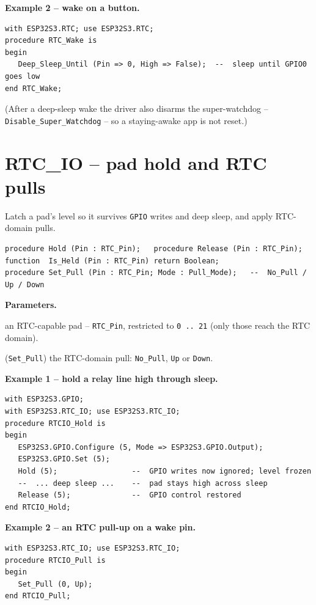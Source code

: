 \textbf{Example 2 -- wake on a button.}
\begin{lstlisting}
with ESP32S3.RTC; use ESP32S3.RTC;
procedure RTC_Wake is
begin
   Deep_Sleep_Until (Pin => 0, High => False);  --  sleep until GPIO0 goes low
end RTC_Wake;
\end{lstlisting}
(After a deep-sleep wake the driver also disarms the super-watchdog --
\texttt{Disable\_Super\_Watchdog} -- so a staying-awake app is not reset.)

\section{RTC\_IO -- pad hold and RTC pulls}

Latch a pad's level so it survives \texttt{GPIO} writes and deep sleep, and apply
RTC-domain pulls.

\begin{lstlisting}
procedure Hold (Pin : RTC_Pin);   procedure Release (Pin : RTC_Pin);
function  Is_Held (Pin : RTC_Pin) return Boolean;
procedure Set_Pull (Pin : RTC_Pin; Mode : Pull_Mode);   --  No_Pull / Up / Down
\end{lstlisting}

\textbf{Parameters.}
\begin{description}[style=nextline]
\item[\texttt{Pin}] an RTC-capable pad -- \texttt{RTC\_Pin}, restricted to
  \texttt{0\,..\,21} (only those reach the RTC domain).
\item[\texttt{Mode}] (\texttt{Set\_Pull}) the RTC-domain pull: \texttt{No\_Pull},
  \texttt{Up} or \texttt{Down}.
\end{description}

\textbf{Example 1 -- hold a relay line high through sleep.}
\begin{lstlisting}
with ESP32S3.GPIO;
with ESP32S3.RTC_IO; use ESP32S3.RTC_IO;
procedure RTCIO_Hold is
begin
   ESP32S3.GPIO.Configure (5, Mode => ESP32S3.GPIO.Output);
   ESP32S3.GPIO.Set (5);
   Hold (5);                 --  GPIO writes now ignored; level frozen
   --  ... deep sleep ...    --  pad stays high across sleep
   Release (5);              --  GPIO control restored
end RTCIO_Hold;
\end{lstlisting}

\textbf{Example 2 -- an RTC pull-up on a wake pin.}
\begin{lstlisting}
with ESP32S3.RTC_IO; use ESP32S3.RTC_IO;
procedure RTCIO_Pull is
begin
   Set_Pull (0, Up);
end RTCIO_Pull;
\end{lstlisting}


